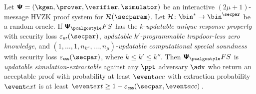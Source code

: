 
\begin{theorem}
	\label{thm:se}
	Let $\ps = (\kgen, \prover, \verifier, \simulator)$ be an interactive
	$(2 \mu + 1)$-message HVZK proof system for $\RELGEN(\secparam)$. Let
	$\ro \colon \bin^{*} \to \bin^{\secpar}$ be a random oracle. If $\psfs$ has the
	$k$-\emph{updatable unique response property} with security loss $\epsur(\secpar)$, 
	\emph{updatable $k'$-programmable trapdoor-less zero knowledge}, and $(1, \ldots, 1, n_{k''}, \ldots, n_\mu)$-\emph{updatable computational special soundness} with security loss $\epscss(\secpar)$, where $k \leq k' \leq k''$. Then $\psfs$ is \emph{updatable simulation-extractable} against any $\ppt$ adversary $\advse$ who return an acceptable proof with probability at least $\accProb$ with 	extraction probability $\extProb$ is at least
	$\extProb \geq 1 - \epscss(\secpar, \accProb)\,$.
\end{theorem}

